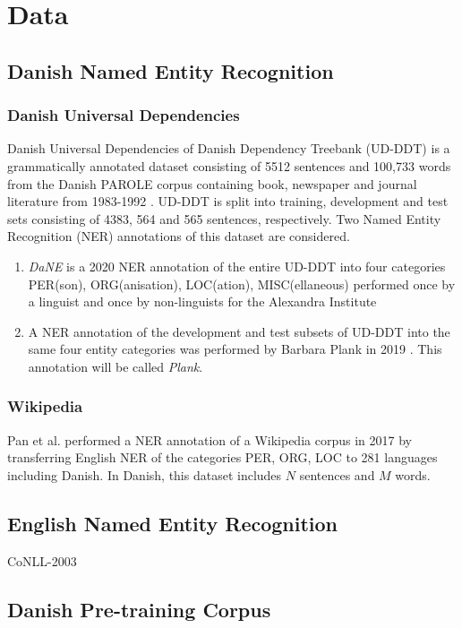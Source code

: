 \documentclass[main.tex]{subfiles}
\begin{document}
\chapter{Data}

\section{Danish Named Entity Recognition}
\subsection{Danish Universal Dependencies}
Danish Universal Dependencies of Danish Dependency Treebank (UD-DDT) \cite{johann2015udddt} is a grammatically annotated dataset consisting of 5512 sentences and 100,733 words from the Danish PAROLE corpus containing book, newspaper and journal literature from 1983-1992 \cite{christensen1998parole}.
UD-DDT is split into training, development and test sets consisting of 4383, 564 and 565 sentences, respectively.
Two Named Entity Recognition (NER) annotations of this dataset are considered.
\begin{enumerate}
    \item \emph{DaNE} is a 2020 NER annotation of the entire UD-DDT into four categories PER(son), ORG(anisation), LOC(ation), MISC(ellaneous) performed once by a linguist and once by non-linguists for the Alexandra Institute \cite[Sec. 4]{hvingelby2020dane}
    \item A NER annotation of the development and test subsets of UD-DDT into the same four entity categories was performed by Barbara Plank in 2019 \cite{plank2019neural}.
        This annotation will be called \emph{Plank}.
\end{enumerate}

\subsection{Wikipedia}
Pan et al. performed a NER annotation of a Wikipedia corpus in 2017 by transferring English NER of the categories PER, ORG, LOC to 281 languages including Danish.
In Danish, this dataset includes $N$ sentences and $M$ words.

\section{English Named Entity Recognition}
CoNLL-2003

\cite{tjang2003conll}
\section{Danish Pre-training Corpus}
\end{document}
